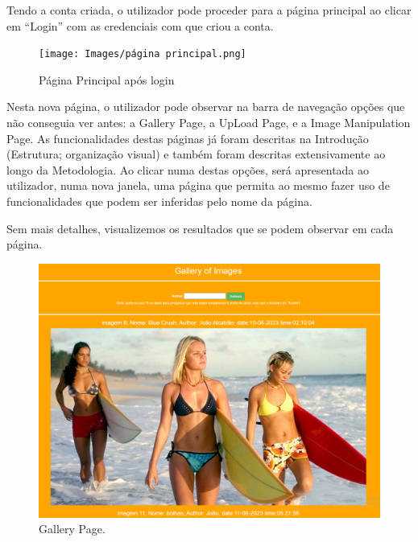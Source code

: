 \documentclass{report}
\begin{document}
    Tendo a conta criada, o utilizador pode proceder para a página principal ao clicar em “Login” com as credenciais com que criou a conta.

    \begin{figure}[!hbtp]
        \centering 
        \texttt{[image: Images/página principal.png]}
        \caption{\label{Home}Página Principal após login}
    \end{figure}

\newpage


    Nesta nova página, o utilizador pode observar na barra de navegação opções que não conseguia ver antes: a Gallery Page, a UpLoad Page, e a Image Manipulation Page. As funcionalidades destas páginas já foram descritas na Introdução (Estrutura; organização visual) e também foram descritas extensivamente ao longo da Metodologia. Ao clicar numa destas opções, será apresentada ao utilizador, numa nova janela, uma página que permita ao mesmo fazer uso de funcionalidades que podem ser inferidas pelo nome da página.

         \linebreak
    \bigskip
    Sem mais detalhes, visualizemos os resultados que se podem observar em cada página.

    \begin{figure}[!hbtp]
        \centering 
        \includegraphics[scale=0.350]{Images_code/0 - galeria.png}
        \caption{\label{Gallery}Gallery Page.}
    \end{figure}
\end{document}
